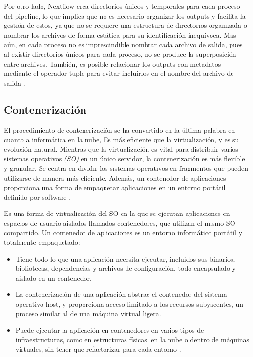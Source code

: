 \documentclass[12pt]{article}
\begin{document}
Por otro lado, Nextflow crea directorios únicos y 
temporales para cada proceso del pipeline, lo que implica que no es 
necesario organizar los outputs y facilita la gestión de estos, ya que no 
se requiere una estructura de directorios organizada o nombrar los archivos 
de forma estática para su identificación inequívoca. Más aún, en cada proceso 
no es imprescindible nombrar cada archivo de salida, pues al existir directorios 
únicos para cada proceso, no se produce la superposición entre archivos. También, 
es posible relacionar los outputs con metadatos mediante el operador tuple para 
evitar incluirlos en el nombre del archivo de salida \cite{Lomas}.

\subsection*{Contenerización}

El procedimiento de contenerización se ha convertido en la última palabra en 
cuanto a informática en la nube,  Es más eficiente que la virtualización, y es 
su evolución natural. Mientras que la virtualización es vital para distribuir 
varios sistemas operativos \emph{(SO)} en un único servidor, la contenerización es más 
flexible y granular. Se centra en dividir los sistemas operativos en fragmentos 
que pueden utilizarse de manera más eficiente. Además, un contenedor de aplicaciones 
proporciona una forma de empaquetar aplicaciones en un entorno portátil definido por 
software \cite{Containerization}. 

Es una forma de virtualización del SO en la que se ejecutan aplicaciones en 
espacios de usuario aislados llamados contenedores, que utilizan el mismo SO 
compartido. Un contenedor de aplicaciones es un entorno informático portátil y 
totalmente empaquetado:

\begin{itemize}
    \item Tiene todo lo que una aplicación necesita ejecutar, incluidos sus 
        binarios, bibliotecas, dependencias y archivos de configuración, todo 
        encapsulado y aislado en un contenedor.
    \item La contenerización de una aplicación abstrae el contenedor del 
        sistema operativo host, y proporciona acceso limitado a los recursos 
        subyacentes, un proceso similar al de una máquina virtual ligera.
    \item Puede ejecutar la aplicación en contenedores en varios tipos de 
        infraestructuras, como en estructuras físicas, en la nube o dentro de 
        máquinas virtuales, sin tener que refactorizar para cada entorno \cite{Containerization}.
\end{itemize}
\end{document}
